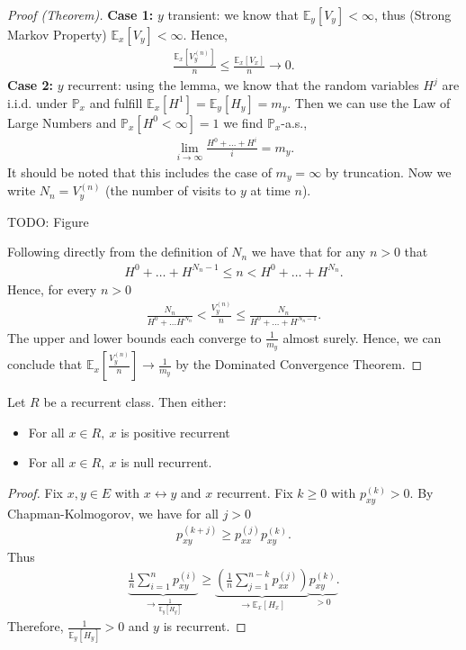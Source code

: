 \begin{proof}[Proof (Theorem)]
	\textbf{Case 1:} $y$ transient:	we know that $\mathbb{E}_{y} \left[ V_y \right] < \infty$, thus (Strong Markov Property) $\mathbb{E}_{x} \left[ V_y \right] < \infty$. Hence,
	\begin{align}
		\frac{\mathbb{E}_{x} \left[ V_y^{(n)} \right] }{n} \leq \frac{\mathbb{E}_{x} \left[ V_x \right] }{n} \to 0
	.\end{align}
	\textbf{Case 2:} $y$ recurrent: using the lemma, we know that the random variables $H^j$ are i.i.d. under $\mathbb{P}_{x}$ and fulfill $\mathbb{E}_{x} \left[ H^1 \right] = \mathbb{E}_{y} \left[ H_y \right]  = m_y$. Then we can use the Law of Large Numbers and $\mathbb{P}_{x} \left[ H^0 < \infty \right] =1$ we find $\mathbb{P}_{x}$-a.s.,
	\begin{align}
		\lim_{i\to \infty } \frac{H^0 + \ldots + H^i}{i} = m_y
	.\end{align}
	It should be noted that this includes the case of $m_y=\infty$ by truncation. Now we write $N_n = V_y^{(n)}$ (the number of visits to $y$ at time $n$).

	TODO: Figure

Following directly from the definition of $N_n$ we have that for any $n> 0$ that 
\begin{align}
	H^0 + \ldots + H^{N_n -1} \leq n < H^0 + \ldots + H^{N_n}
.\end{align}
Hence, for every $n> 0$ 
\begin{align}
\frac{N_n}{H^0 + \ldots H^{N_n}} < \frac{V_y^{(n)}}{n} \leq \frac{N_n}{H^0 + \ldots + H^{N_n -1}} 
.\end{align}
The upper and lower bounds each converge to $\frac{1}{m_y}$ almost surely. Hence, we can conclude that $\mathbb{E}_{x} \left[ \frac{V_y^{(n)}}{n} \right] \to \frac{1}{m_y}$ by the Dominated Convergence Theorem.
\end{proof}


\begin{prop}
	Let $R$ be a recurrent class. Then either:
\begin{itemize}
	\item For all $x \in R,\ x$ is positive recurrent
	\item For all $x \in R,\ x$ is null recurrent.
\end{itemize}
\end{prop}
\begin{proof}
	Fix $x,y \in E$ with $x  \leftrightarrow  y$ and $x$ recurrent. Fix $k\geq 0$ with $p_{xy}^{(k)}>0$. By Chapman-Kolmogorov, we have for all $j> 0$
	\begin{align}
		p_{xy}^{(k+j)} \geq p_{xx}^{(j)} p_{xy}^{(k)}	
.	\end{align}
Thus	
\begin{align}
	\underbrace{\frac{1}{n} \sum_{i=1}^{n} p_{xy}^{(i)}}_{\to  \frac{1}{\mathbb{E}_{y} \left[ H_y \right] }} \geq \underbrace{\left( \frac{1}{n} \sum_{j=1}^{n-k} p_{xx}^{(j)} \right)}_{\to \mathbb{E}_{x} \left[ H_x \right]} \underbrace{p_{xy}^{(k)}}_{>0}
.\end{align}
Therefore, $\frac{1}{\mathbb{E}_{y} \left[ H_y \right] }> 0$ and $y$ is recurrent.
\end{proof}


